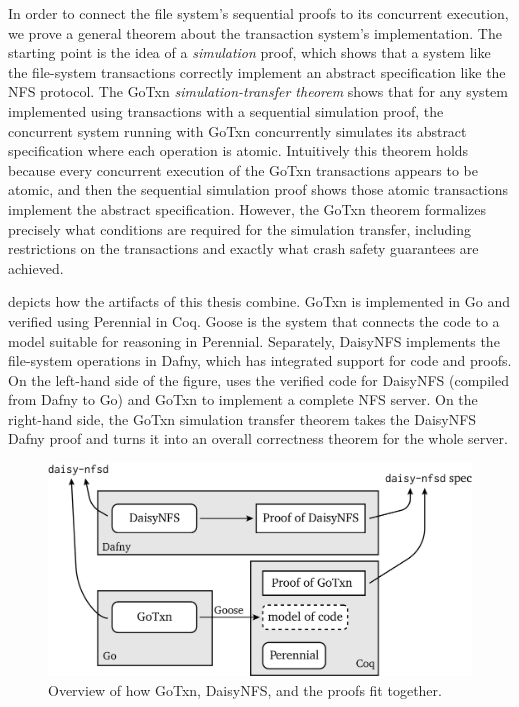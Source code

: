 In order to connect the file system's sequential proofs to its concurrent
execution, we prove a general theorem about the transaction system's
implementation. The starting point is the idea of a \emph{simulation} proof,
which shows that a system like the file-system transactions correctly implement an
abstract specification like the NFS protocol. The GoTxn
\emph{simulation-transfer theorem} shows that for any system implemented using
transactions with a sequential simulation proof, the concurrent system running
with GoTxn concurrently simulates its abstract specification where each
operation is atomic. Intuitively this theorem holds because every concurrent
execution of the GoTxn transactions appears to be atomic, and then the
sequential simulation proof shows those atomic transactions implement the
abstract specification. However, the GoTxn theorem formalizes precisely what
conditions are required for the simulation transfer, including restrictions on
the transactions and exactly what crash safety guarantees are achieved.

 depicts how the artifacts of this thesis combine. GoTxn is
implemented in Go and verified using Perennial in Coq. Goose is the system that
connects the code to a model suitable for reasoning in Perennial. Separately,
DaisyNFS implements the file-system operations in Dafny, which has integrated
support for code and proofs. On the left-hand side of the figure,
 uses the verified code for DaisyNFS (compiled from Dafny to Go)
and GoTxn to implement a complete NFS server. On the right-hand side, the GoTxn
simulation transfer theorem takes the DaisyNFS Dafny proof and turns it into an
overall correctness theorem for the whole server.

\begin{figure}
\includegraphics{fig/overview.png}
\caption{Overview of how GoTxn, DaisyNFS, and the proofs fit together.}
\label{fig:overview}
\end{figure}

